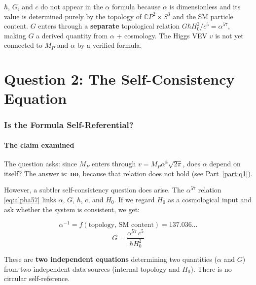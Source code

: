 \documentclass[12pt,a4paper]{article}
\newcommand{\CP}{\mathbb{C}P}
\begin{document}
\begin{tcolorbox}[colback=blue!5!white, colframe=blue!60!black, title=Answer to Question 1]
$\hbar$, $G$, and $c$ do not appear in the $\alpha$ formula because $\alpha$ is dimensionless and its value is determined purely by the topology of $\CP^2 \times S^3$ and the SM particle content. $G$ enters through a \textbf{separate} topological relation $G\hbar H_0^2/c^5 = \alpha^{57}$, making $G$ a derived quantity from $\alpha$ + cosmology. The Higgs VEV $v$ is not yet connected to $M_P$ and $\alpha$ by a verified formula.
\end{tcolorbox}


\part{Question 2: The Self-Consistency Equation}
\label{part:q2}

\section{Is the Formula Self-Referential?}

\subsection{The claim examined}

The question asks: since $M_P$ enters through $v = M_P\alpha^8\sqrt{2\pi}$, does $\alpha$ depend on itself? The answer is: \textbf{no}, because that relation does not hold (see Part~\ref{part:q1}).

However, a subtler self-consistency question does arise. The $\alpha^{57}$ relation \eqref{eq:alpha57} links $\alpha$, $G$, $\hbar$, $c$, and $H_0$. If we regard $H_0$ as a cosmological input and ask whether the system is consistent, we get:

\begin{equation}
\alpha^{-1} = f(\text{topology, SM content}) = 137.036\ldots
\end{equation}
\begin{equation}
G = \frac{\alpha^{57}\,c^5}{\hbar H_0^2}
\end{equation}

These are \textbf{two independent equations} determining two quantities ($\alpha$ and $G$) from two independent data sources (internal topology and $H_0$). There is no circular self-reference.
\end{document}

